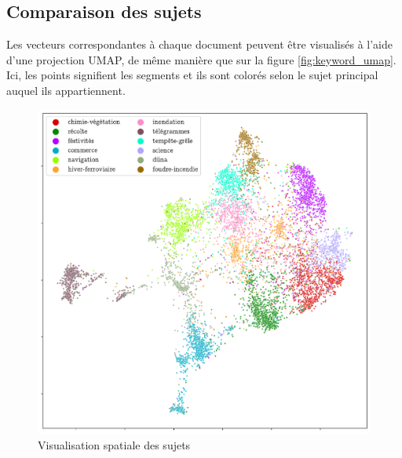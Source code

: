 \documentclass[a4paper,twoside,12pt]{article}
\begin{document}
\clearpage

\subsection{Comparaison des sujets} \label{comparison}

Les vecteurs correspondantes à chaque document peuvent être visualisés à l'aide d'une projection UMAP, de même manière que sur la figure \ref{fig:keyword_umap}. Ici, les points signifient les segments et ils sont colorés selon le sujet principal auquel ils appartiennent.

\begin{figure}[h]
    \centering
    \includegraphics[width=\textwidth]{images/topics_umap.pdf}
    \caption{Visualisation spatiale des sujets}
    \label{fig:topic_umap}
\end{figure}
\end{document}
